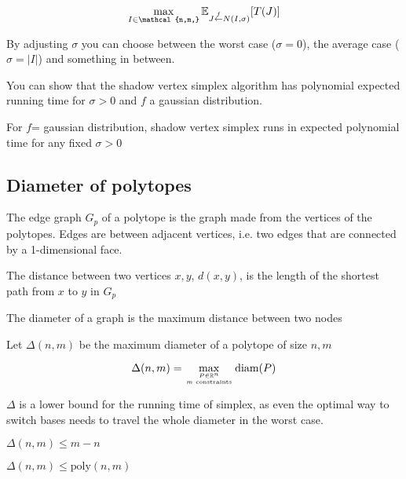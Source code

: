 \[\max_{I\in \mathcal{n,m,}} \E_{J\stackrel{f}{\leftarrow} N(I,\sigma)} [T(J)]\]

By adjusting $\sigma$ you can choose between the worst case ($\sigma=0$), the average case ($\sigma = |I|$) and something in between.

You can show that the shadow vertex simplex algorithm has polynomial expected running time for $\sigma>0$ and $f$ a gaussian distribution.

\begin{thm}[Spielmann '01] For $f$= gaussian distribution, shadow vertex simplex runs in expected polynomial time for any fixed $\sigma>0$
\end{thm}

\subsection{Diameter of polytopes}

\begin{Def} The edge graph $G_p$ of a polytope is the graph made from the vertices of the polytopes. Edges are between adjacent vertices, i.e. two edges that are connected by a 1-dimensional face.
\end{Def}

\begin{Def} The distance between two vertices $x,y$, $d(x,y)$, is the length of the shortest path from $x$ to $y$ in $G_p$
\end{Def}

\begin{Def} The diameter of a graph is the maximum distance between two nodes\end{Def}

\begin{Def} Let $\Delta(n,m)$ be the maximum diameter of a polytope of size $n,m$

\[\Delta(n,m) = \max_{{P\in \mathbb{R}^n}\atop {m \text{ constraints}}} \text{diam}(P) \]
\end{Def}

$\Delta$ is a lower bound for the running time of simplex, as even the optimal way to switch bases needs to travel the whole diameter in the worst case.

\begin{thm} $\Delta(n,m)\leq m-n$\end{thm}
\begin{thm} $\Delta(n,m)\leq \text{poly}(n,m)$\end{thm}

